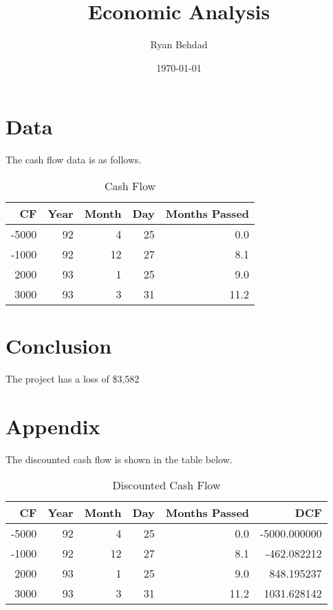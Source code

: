 \documentclass{article}%
\title{Economic Analysis}%
\author{Ryan Behdad}%
\date{\today}%
\begin{document}
%
\normalsize%
\maketitle%
\section{Data}%
\label{sec:Data}%
The cash flow data is as follows.%


\begin{table}[htbp]%
\caption{Cash Flow}%
\centering%
\begin{tabular}{rrrrr}
\toprule
   CF &  Year &  Month &  Day &  Months Passed \\
\midrule
-5000 &    92 &      4 &   25 &            0.0 \\
-1000 &    92 &     12 &   27 &            8.1 \\
 2000 &    93 &      1 &   25 &            9.0 \\
 3000 &    93 &      3 &   31 &           11.2 \\
\bottomrule
\end{tabular}
%
\end{table}

%
\section{Conclusion}%
\label{sec:Conclusion}%
The project has a loss of \$3,582

%
\section{Appendix}%
\label{sec:Appendix}%
The discounted cash flow is shown in the table below.%


\begin{table}[htbp]%
\caption{Discounted Cash Flow}%
\centering%
\begin{tabular}{rrrrrr}
\toprule
   CF &  Year &  Month &  Day &  Months Passed &          DCF \\
\midrule
-5000 &    92 &      4 &   25 &            0.0 & -5000.000000 \\
-1000 &    92 &     12 &   27 &            8.1 &  -462.082212 \\
 2000 &    93 &      1 &   25 &            9.0 &   848.195237 \\
 3000 &    93 &      3 &   31 &           11.2 &  1031.628142 \\
\bottomrule
\end{tabular}
%
\end{table}

%
\end{document}
